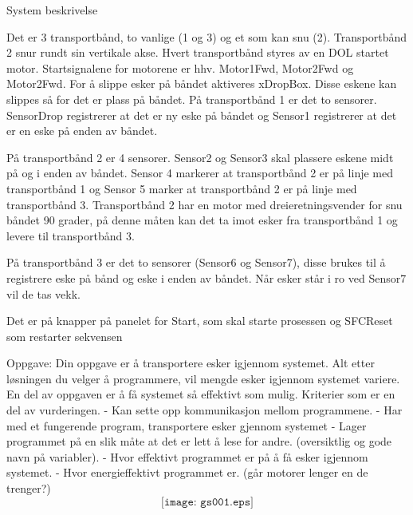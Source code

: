 

System beskrivelse

Det er 3 transportbånd, to vanlige (1 og 3) og et som kan snu (2). Transportbånd 2 snur rundt sin vertikale akse. Hvert transportbånd styres av en DOL startet motor. Startsignalene for motorene er hhv. Motor1Fwd, Motor2Fwd og Motor2Fwd. For å slippe esker på båndet aktiveres xDropBox. Disse eskene kan slippes så for det er plass på båndet. 
På transportbånd 1 er det to sensorer. SensorDrop registrerer at det er ny eske på båndet og Sensor1 registrerer at det er en eske på enden av båndet.
 
På transportbånd 2 er 4 sensorer. Sensor2 og Sensor3 skal plassere eskene midt på og i enden av båndet. Sensor 4 markerer at transportbånd 2 er på linje med transportbånd 1 og Sensor 5 marker at transportbånd 2 er på linje med transportbånd 3. Transportbånd 2 har en motor med dreieretningsvender for snu båndet 90 grader, på denne måten kan det ta imot esker fra transportbånd 1 og levere til transportbånd 3.

På transportbånd 3 er det to sensorer (Sensor6 og Sensor7), disse brukes til å registrere eske på bånd og eske i enden av båndet. Når esker står i ro ved Sensor7 vil de tas vekk. 

Det er på knapper på panelet for Start, som skal starte prosessen og SFCReset som restarter sekvensen 

Oppgave:
Din oppgave er å transportere esker igjennom systemet. Alt etter løsningen du velger å programmere, vil mengde esker igjennom systemet variere. En del av oppgaven er å få systemet så effektivt som mulig. 
Kriterier som er en del av vurderingen. 
-	Kan sette opp kommunikasjon mellom programmene. 
-	Har med et fungerende program, transportere esker gjennom systemet
-	Lager programmet på en slik måte at det er lett å lese for andre. (oversiktlig og gode navn på variabler). 
-	Hvor effektivt programmet er på å få esker igjennom systemet. 
-	Hvor energieffektivt programmet er. (går motorer lenger en de trenger?)
$$\texttt{[image: gs001.eps]}$$



